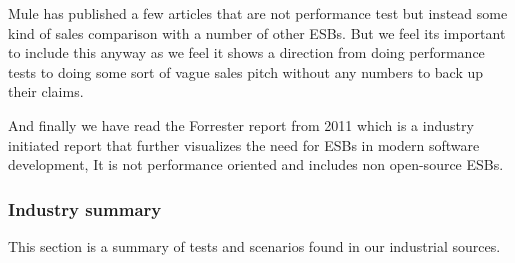 Mule has published a few articles that are not performance test but instead some kind of sales comparison with a number of other ESBs\cite{mulevsjboss,mulevsglassfish,mulevsservicemix}.
But we feel its important to include this anyway as we feel it shows a direction from doing performance tests to doing some sort of vague sales pitch without any numbers to back up their claims.

And finally we have read the Forrester report \cite{forrester11} from 2011 which is a industry initiated report that further visualizes the need for ESBs in modern software development, It is not performance oriented and includes non open-source ESBs.

\subsubsection{Industry summary}
This section is a summary of tests and scenarios found in our industrial sources.


